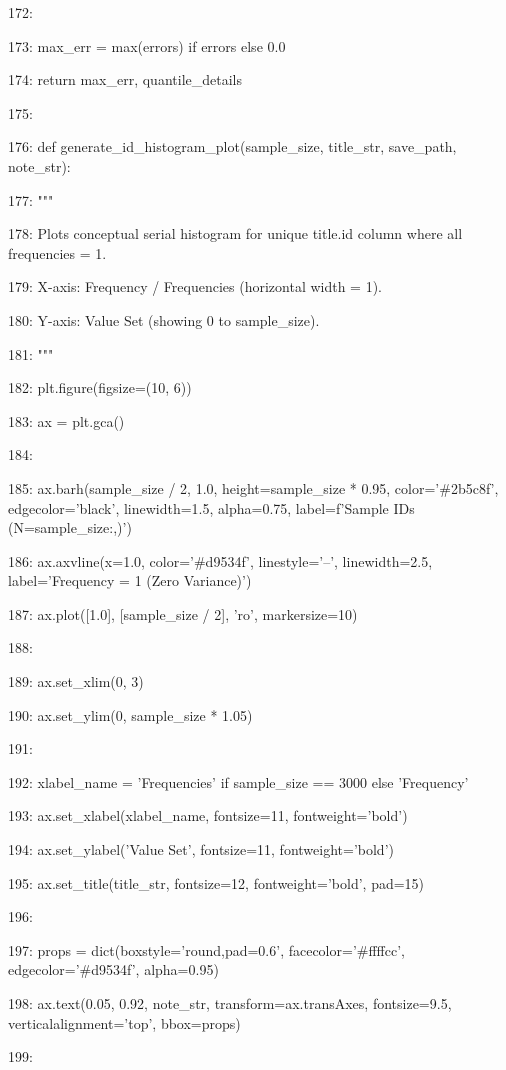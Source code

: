\documentclass[11pt,a4paper]{article}
\begin{document}
172:

173:     max\_err = max(errors) if errors else 0.0

174:     return max\_err, quantile\_details

175:

176: def generate\_id\_histogram\_plot(sample\_size, title\_str, save\_path, note\_str):

177:     """

178:     Plots conceptual serial histogram for unique title.id column where all frequencies = 1.

179:     X-axis: Frequency / Frequencies (horizontal width = 1).

180:     Y-axis: Value Set (showing 0 to sample\_size).

181:     """

182:     plt.figure(figsize=(10, 6))

183:     ax = plt.gca()

184:

185:     ax.barh(sample\_size / 2, 1.0, height=sample\_size * 0.95, color='\#2b5c8f', edgecolor='black', linewidth=1.5, alpha=0.75, label=f'Sample IDs (N={sample\_size:,})')

186:     ax.axvline(x=1.0, color='\#d9534f', linestyle='--', linewidth=2.5, label='Frequency = 1 (Zero Variance)')

187:     ax.plot([1.0], [sample\_size / 2], 'ro', markersize=10)

188:

189:     ax.set\_xlim(0, 3)

190:     ax.set\_ylim(0, sample\_size * 1.05)

191:

192:     xlabel\_name = 'Frequencies' if sample\_size == 3000 else 'Frequency'

193:     ax.set\_xlabel(xlabel\_name, fontsize=11, fontweight='bold')

194:     ax.set\_ylabel('Value Set', fontsize=11, fontweight='bold')

195:     ax.set\_title(title\_str, fontsize=12, fontweight='bold', pad=15)

196:

197:     props = dict(boxstyle='round,pad=0.6', facecolor='\#ffffcc', edgecolor='\#d9534f', alpha=0.95)

198:     ax.text(0.05, 0.92, note\_str, transform=ax.transAxes, fontsize=9.5, verticalalignment='top', bbox=props)

199:
\end{document}

